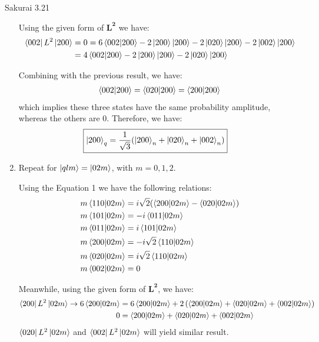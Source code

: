 \documentclass{article}
\newcommand{\bs}{\boldsymbol}
\begin{document}
\begin{section}{Sakurai 3.21}
\begin{enumerate}
\begin{tcolorbox}
		Using the given form of $\bs{L^2}$ we have:
		\begin{align*}
			\bra{002}L^2\ket{200} & = 0 = 6\bra{002}\ket{200} - 2\ket{200}\ket{200} - 2\ket{020}\ket{200} - 2\ket{002}\ket{200} \\
			                      & =  4\bra{002}\ket{200} - 2\ket{200}\ket{200} - 2\ket{020}\ket{200}
		\end{align*}

		Combining with the previous result, we have:
		\begin{align*}
			\bra{002}\ket{200} = \bra{020}\ket{200} = \bra{200}\ket{200}
		\end{align*}
		which implies these three states have the same probability amplitude, whereas the others are 0. Therefore, we have:
		\begin{align*}
			\Aboxed{\ket{200}_q & = \frac{1}{\sqrt{3}} (\ket{200}_n + \ket{020}_n + \ket{002}_n)}
		\end{align*}
	\end{tcolorbox}

	\newpage
	\item Repeat for $\ket{qlm} = \ket{02m}$, with $m = 0, 1, 2$.
	\begin{tcolorbox}[breakable]
		Using the Equation 1 we have the following relations:
		\begin{align*}
			m\bra{110}\ket{02m} & = i\sqrt{2}(\bra{200}\ket{02m} - \bra{020}\ket{02m}) \\
			m\bra{101}\ket{02m} & = -i\bra{011}\ket{02m}                               \\
			m\bra{011}\ket{02m} & = i\bra{101}\ket{02m}                                \\
			m\bra{200}\ket{02m} & = -i\sqrt{2}\bra{110}\ket{02m}                       \\
			m\bra{020}\ket{02m} & = i\sqrt{2}\bra{110}\ket{02m}                        \\
			m\bra{002}\ket{02m} & = 0
		\end{align*}

		Meanwhile, using the given form of $\bs{L^2}$, we have:
		\begin{align*}
			\bra{200}L^2\ket{02m} \to 6 \bra{200}\ket{02m} & = 6 \bra{200}\ket{02m} + 2\left( \bra{200}\ket{02m} + \bra{020}\ket{02m} + \bra{002}\ket{02m} \right) \\
			0                                              & = \bra{200}\ket{02m} + \bra{020}\ket{02m} + \bra{002}\ket{02m}
		\end{align*}
		$\bra{020}L^2\ket{02m}$ and $\bra{002}L^2\ket{02m}$ will yield similar result.


\end{tcolorbox}
\end{enumerate}
\end{section}
\end{document}
